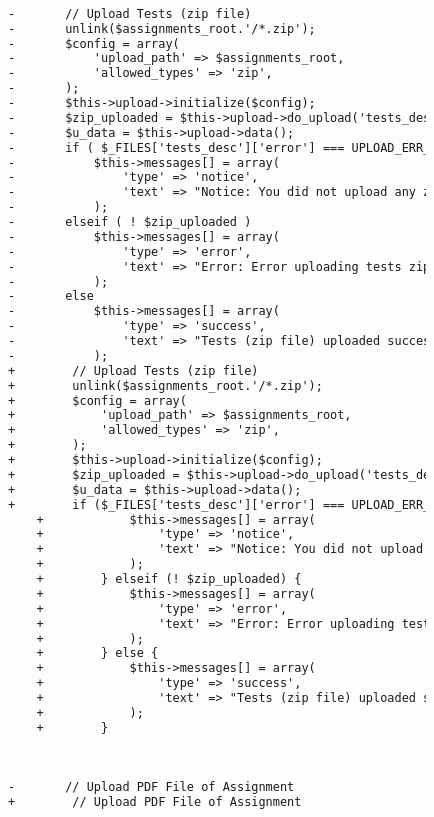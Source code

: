 \begin{lstlisting}[language=diff, caption=Perubahan pada kode Assignments.php]
			
			
			-		// Upload Tests (zip file)
			-		unlink($assignments_root.'/*.zip');
			-		$config = array(
			-			'upload_path' => $assignments_root,
			-			'allowed_types' => 'zip',
			-		);
			-		$this->upload->initialize($config);
			-		$zip_uploaded = $this->upload->do_upload('tests_desc');
			-		$u_data = $this->upload->data();
			-		if ( $_FILES['tests_desc']['error'] === UPLOAD_ERR_NO_FILE )
			-			$this->messages[] = array(
			-				'type' => 'notice',
			-				'text' => "Notice: You did not upload any zip file for tests. If needed, upload by editing assignment."
			-			);
			-		elseif ( ! $zip_uploaded )
			-			$this->messages[] = array(
			-				'type' => 'error',
			-				'text' => "Error: Error uploading tests zip file: ".$this->upload->display_errors('', '')
			-			);
			-		else
			-			$this->messages[] = array(
			-				'type' => 'success',
			-				'text' => "Tests (zip file) uploaded successfully."
			-			);
			+        // Upload Tests (zip file)
			+        unlink($assignments_root.'/*.zip');
			+        $config = array(
			+            'upload_path' => $assignments_root,
			+            'allowed_types' => 'zip',
			+        );
			+        $this->upload->initialize($config);
			+        $zip_uploaded = $this->upload->do_upload('tests_desc');
			+        $u_data = $this->upload->data();
			+        if ($_FILES['tests_desc']['error'] === UPLOAD_ERR_NO_FILE) {
				+            $this->messages[] = array(
				+                'type' => 'notice',
				+                'text' => "Notice: You did not upload any zip file for tests. If needed, upload by editing assignment."
				+            );
				+        } elseif (! $zip_uploaded) {
				+            $this->messages[] = array(
				+                'type' => 'error',
				+                'text' => "Error: Error uploading tests zip file: ".$this->upload->display_errors('', '')
				+            );
				+        } else {
				+            $this->messages[] = array(
				+                'type' => 'success',
				+                'text' => "Tests (zip file) uploaded successfully."
				+            );
				+        }
			
			
			
			-		// Upload PDF File of Assignment
			+        // Upload PDF File of Assignment
			

\end{lstlisting}
